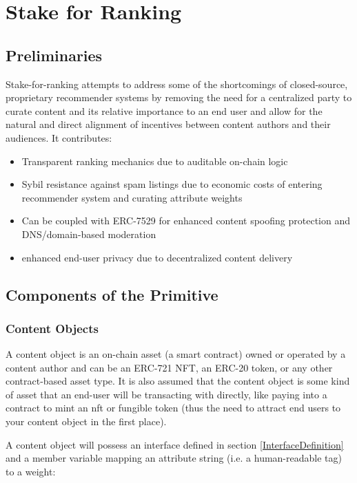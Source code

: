 \section{Stake for Ranking} 
\label{section:ProtocolDescription}

\subsection{Preliminaries}
Stake-for-ranking attempts to address some of the shortcomings of closed-source, proprietary recommender systems by removing the need for a centralized party to curate content and its relative importance to an end user and allow for the natural and direct alignment of incentives between content authors and their audiences. It contributes:
\begin{itemize}
    \item Transparent ranking mechanics due to auditable on-chain logic
    \item Sybil resistance against spam listings due to economic costs of entering recommender system and curating attribute weights
    \item Can be coupled with ERC-7529 \cite{chapman2023erc7529} for enhanced content spoofing protection and DNS/domain-based moderation
    \item enhanced end-user privacy due to decentralized content delivery
\end{itemize}

\subsection{Components of the Primitive}
\subsubsection{Content Objects}
A content object is an on-chain asset (a smart contract) owned or operated by a content author and can be an ERC-721 NFT, an ERC-20 token, or any other contract-based asset type. It is also assumed that the content object is some kind of asset that an end-user will be transacting with directly, like paying into a contract to mint an nft or fungible token (thus the need to attract end users to your content object in the first place). 

A content object will possess an interface defined in section \ref{InterfaceDefinition} and a member variable mapping an attribute string (i.e. a human-readable tag) to a weight: 

